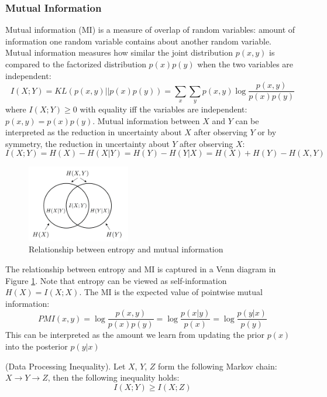 \subsubsection{Mutual Information}

Mutual information (MI) is a measure of overlap of random variables: amount of information one random variable contains about another random variable. Mutual information measures how similar the joint distribution $p(x,y)$ is compared to the factorized distribution $p(x)p(y)$ when the two variables are independent:
\begin{equation}
    I(X;Y) = KL(p(x,y)||p(x)p(y)) = \sum_x \sum_y p(x,y) \log \frac{p(x,y)}{p(x)p(y)}
\end{equation}
where $I(X;Y)\geq 0$ with equality iff the variables are independent: $p(x,y)=p(x)p(y)$. Mutual information between $X$ and $Y$ can be interpreted as the reduction in uncertainty about $X$ after observing $Y$ or by symmetry, the reduction in uncertainty about $Y$ after observing $X$:
\begin{equation}
    I(X;Y) = H(X) - H(X|Y) = H(Y) - H(Y|X) = H(X) + H(Y) - H(X,Y)
\end{equation}
\begin{figure}[tbhp]
    \centering
    \includegraphics[width=0.4\textwidth, trim={10 10 10 10}]{figures/mutual_info.png}
    \caption{Relationship between entropy and mutual information}
    \label{fig:mutual_info}
\end{figure}
The relationship between entropy and MI is captured in a Venn diagram in Figure \ref{fig:mutual_info}. Note that entropy can be viewed as self-information $H(X) = I(X;X)$. The MI is the expected value of pointwise mutual information:
\begin{equation}
    PMI(x,y) = \log \frac{p(x,y)}{p(x)p(y)} = \log \frac{p(x|y)}{p(x)} = \log \frac{p(y|x)}{p(y)}
\end{equation}
This can be interpreted as the amount we learn from updating the prior $p(x)$ into the posterior $p(y|x)$
\begin{theorem}
(Data Processing Inequality). Let $X$, $Y$, $Z$ form the following Markov chain: $X\rightarrow Y\rightarrow Z$, then the following inequality holds:
\begin{equation}
    I(X;Y) \geq I(X;Z)
\end{equation}
\end{theorem}

